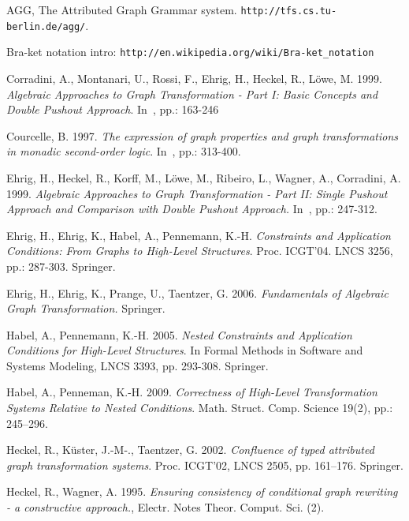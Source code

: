 \documentclass{fundam}
\begin{document}
\begin{thebibliography}{10}\label{bibliography}

 AGG, The Attributed Graph Grammar system. {\texttt
    {http://tfs.cs.tu-berlin.de/agg/}}.

 Bra-ket notation intro:
  {\texttt{http://en.wikipedia.org/wiki/Bra-ket\_notation}}

 Corradini, A., Montanari, U., Rossi, F., Ehrig,
  H., Heckel, R., L\"owe, M. 1999.  {\em Algebraic Approaches to Graph
    Transformation - Part I: Basic Concepts and Double Pushout
    Approach}.  In~\cite{handbook}, pp.: 163-246

 Courcelle, B. 1997. \emph{The expression of graph
    properties and graph transformations in monadic second-order
    logic}.  In~\cite{handbook}, pp.: 313-400.



 Ehrig, H., Heckel, R., Korff, M., L\"owe, M.,
  Ribeiro, L., Wagner, A., Corradini, A. 1999.  {\em Algebraic
    Approaches to Graph Transformation - Part II: Single Pushout
    Approach and Comparison with Double Pushout Approach.}
  In~\cite{handbook}, pp.: 247-312.

 Ehrig, H., Ehrig, K., Habel, A., Pennemann, K.-H.
  {\em Constraints and Application Conditions: From Graphs to
    High-Level Structures}.  Proc. ICGT'04. LNCS 3256, pp.: 287-303.
  Springer.

 Ehrig, H., Ehrig, K., Prange, U., Taentzer, G.
  2006.  {\em Fundamentals of Algebraic Graph Transformation.}
  Springer.



 Habel, A., Pennemann, K.-H. 2005. {\em Nested
    Constraints and Application Conditions for High-Level Structures}.
  In Formal Methods in Software and Systems Modeling, LNCS 3393, pp.
  293-308. Springer.

 Habel, A., Penneman, K.-H. 2009. {\em Correctness of High-Level
Transformation Systems Relative to Nested
Conditions}. Math. Struct. Comp. Science 19(2), pp.: 245--296.

 Heckel, R., K\"uster, J.-M-., Taentzer, G. 2002.
  {\em Confluence of typed attributed graph transformation systems}.
  Proc. ICGT'02, LNCS 2505, pp. 161--176. Springer.

 Heckel, R., Wagner, A. 1995.  {\em Ensuring
    consistency of conditional graph rewriting - a constructive
    approach.}, Electr. Notes Theor. Comput. Sci. (2).


\end{thebibliography}
\end{document}
